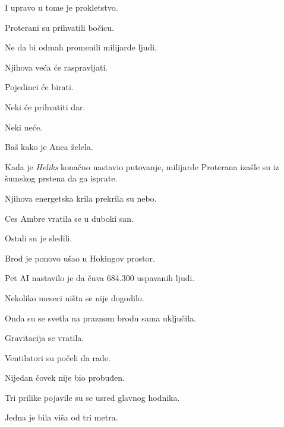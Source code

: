 \bigskip

I upravo u tome je prokletstvo.

\bigskip

Proterani su prihvatili bočicu.

\bigskip

Ne da bi odmah promenili milijarde ljudi.

\bigskip

Njihova veća će raspravljati.

Pojedinci će birati.

\bigskip

Neki će prihvatiti dar.

\bigskip

Neki neće.

\bigskip

Baš kako je Anea želela.

\bigskip

Kada je \emph{Heliks} konačno nastavio putovanje, milijarde Proterana izašle su iz šumskog prstena da ga isprate.

\bigskip

Njihova energetska krila prekrila su nebo.

\bigskip

Ces Ambre vratila se u duboki san.

\bigskip

Ostali su je sledili.

\bigskip

Brod je ponovo ušao u Hokingov prostor.

\bigskip

Pet AI nastavilo je da čuva 684.300 uspavanih ljudi.

\bigskip

Nekoliko meseci ništa se nije dogodilo.

\bigskip

Onda su se svetla na praznom brodu sama uključila.

\bigskip

Gravitacija se vratila.

Ventilatori su počeli da rade.

\bigskip

Nijedan čovek nije bio probuđen.

\bigskip

Tri prilike pojavile su se usred glavnog hodnika.

\bigskip

Jedna je bila viša od tri metra.

\bigskip

